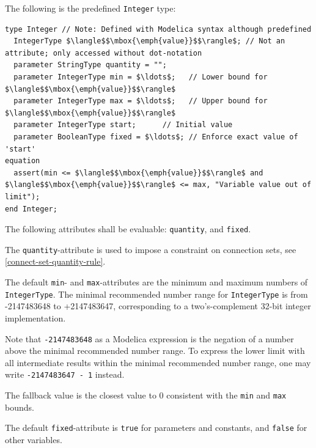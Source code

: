 The following is the predefined \lstinline!Integer! type:
\begin{lstlisting}[language=modelica]
type Integer // Note: Defined with Modelica syntax although predefined
  IntegerType $\langle$$\mbox{\emph{value}}$$\rangle$; // Not an attribute; only accessed without dot-notation
  parameter StringType quantity = "";
  parameter IntegerType min = $\ldots$;   // Lower bound for $\langle$$\mbox{\emph{value}}$$\rangle$
  parameter IntegerType max = $\ldots$;   // Upper bound for $\langle$$\mbox{\emph{value}}$$\rangle$
  parameter IntegerType start;      // Initial value
  parameter BooleanType fixed = $\ldots$; // Enforce exact value of 'start'
equation
  assert(min <= $\langle$$\mbox{\emph{value}}$$\rangle$ and $\langle$$\mbox{\emph{value}}$$\rangle$ <= max, "Variable value out of limit");
end Integer;
\end{lstlisting}%
%
%
%
%

The following attributes shall be evaluable: \lstinline!quantity!, and \lstinline!fixed!.

The \lstinline!quantity!-attribute is used to impose a constraint on connection sets, see \cref{connect-set-quantity-rule}.

The default \lstinline!min!- and \lstinline!max!-attributes are the minimum and maximum numbers of \lstinline!IntegerType!.
The minimal recommended number range for \lstinline!IntegerType! is from -2147483648 to +2147483647, corresponding to a two's-complement 32-bit integer implementation.

\begin{nonnormative}
Note that \lstinline!-2147483648! as a Modelica expression is the negation of a number above the minimal recommended number range.
To express the lower limit with all intermediate results within the minimal recommended number range, one may write \lstinline!-2147483647 - 1! instead.
\end{nonnormative}

The fallback value is the closest value to $0$ consistent with the \lstinline!min! and \lstinline!max! bounds.

The default \lstinline!fixed!-attribute is \lstinline!true! for parameters and constants, and \lstinline!false! for other variables.

